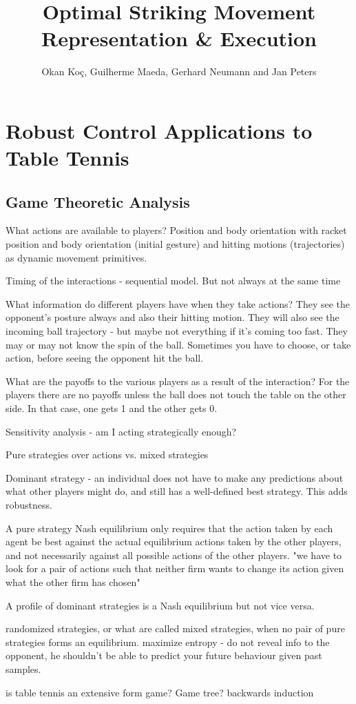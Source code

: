 \documentclass[10pt,a4paper]{article}
\author{Okan Ko\c c, Guilherme Maeda, Gerhard Neumann and Jan Peters}
\title{Optimal Striking Movement Representation \& Execution}
\begin{document}
\maketitle


\section{Robust Control Applications to Table Tennis}

\subsection{Game Theoretic Analysis}

What actions are available to players? Position and body orientation with racket position and body orientation
(initial gesture) and hitting motions (trajectories) as dynamic movement primitives.

Timing of the interactions - sequential model. But not always at the same time

What information do different players have when they take actions? 
They see the opponent's posture always and also their hitting motion. They will also see the incoming ball trajectory - but maybe not everything if it's coming too fast. They may or may not know the spin of the ball.
Sometimes you have to choose, or take action, before seeing the opponent hit the ball.

What are the payoffs to the various players as a result of the interaction?
For the players there are no payoffs unless the ball does not touch the table on the other side. In that case, one gets 1 and the other gets 0.

Sensitivity analysis - am I acting strategically enough?

Pure strategies over actions vs. mixed strategies

Dominant strategy - an individual does not have to make any predictions about what other players
might do, and still has a well-defined best strategy. This adds robustness.

A pure strategy Nash equilibrium only requires that the
action taken by each agent be best against the actual equilibrium actions taken by the other
players, and not necessarily against all possible actions of the other players.
"we have to look for a pair of actions such that neither firm wants
to change its action given what the other firm has chosen"

A profile of dominant strategies is a Nash equilibrium but not vice versa.

randomized strategies, or what are called mixed strategies, when no pair of pure strategies forms an equilibrium.
maximize entropy - do not reveal info to the opponent, he shouldn't be able to predict your future behaviour given past samples.

is table tennis an extensive form game? Game tree? backwards induction 


%
%

\end{document}
